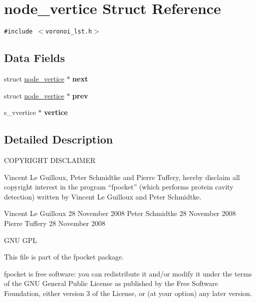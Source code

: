 \hypertarget{structnode__vertice}{
\section{node\_\-vertice Struct Reference}
\label{structnode__vertice}
}
{\tt \#include $<$voronoi\_\-lst.h$>$}

\subsection*{Data Fields}
\begin{CompactItemize}
\item 
\hypertarget{structnode__vertice_61b34ff349d05cc65a4d8b9e2c77ff3e}{
struct \hyperlink{structnode__vertice}{node\_\-vertice} $\ast$ \textbf{next}}
\label{structnode__vertice_61b34ff349d05cc65a4d8b9e2c77ff3e}

\item 
\hypertarget{structnode__vertice_34e93f2ab59c9347ff96f985859d3f61}{
struct \hyperlink{structnode__vertice}{node\_\-vertice} $\ast$ \textbf{prev}}
\label{structnode__vertice_34e93f2ab59c9347ff96f985859d3f61}

\item 
\hypertarget{structnode__vertice_7e7063f6403dfd8f0a8f83462e27729b}{
s\_\-vvertice $\ast$ \textbf{vertice}}
\label{structnode__vertice_7e7063f6403dfd8f0a8f83462e27729b}

\end{CompactItemize}


\subsection{Detailed Description}
COPYRIGHT DISCLAIMER

Vincent Le Guilloux, Peter Schmidtke and Pierre Tuffery, hereby disclaim all copyright interest in the program “fpocket” (which performs protein cavity detection) written by Vincent Le Guilloux and Peter Schmidtke.

Vincent Le Guilloux 28 November 2008 Peter Schmidtke 28 November 2008 Pierre Tuffery 28 November 2008

GNU GPL

This file is part of the fpocket package.

fpocket is free software: you can redistribute it and/or modify it under the terms of the GNU General Public License as published by the Free Software Foundation, either version 3 of the License, or (at your option) any later version.

